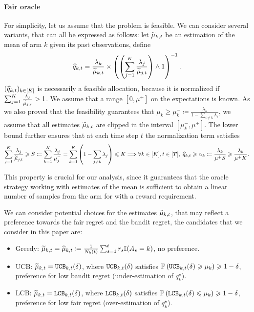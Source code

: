 \paragraph{Fair oracle} For simplicity, let us assume that the problem is feasible. We can consider several variants, that can all be expressed as follows: let $\widetilde{\mu}_{k,t}$ be an estimation of the mean of arm $k$ given its past observations, define \[ \widehat{q}_{k,t}= \frac{\lambda_k}{\widetilde{\mu}_{k, t}} \times \left(\left(\sum_{j=1}^K \frac{\lambda_j}{\widetilde{\mu}_{j, t}}\right) \wedge 1\right)^{-1}.\] 
$(\widehat{q}_{k, t})_{k \in [K]}$ is necessarily a feasible allocation, because it is normalized if $\sum_{j=1}^K \frac{\lambda_j}{\widetilde{\mu}_{j, t}}> 1$. We assume that a range $[0, \mu^+]$ on the expectations is known. As we also proved that the feasibility guarantees that $\mu_k \geq \mu_k^- \coloneqq \frac{\lambda_k}{1-\sum_{i\neq k}\lambda_i}$, we assume that all estimates $\widetilde{\mu}_{k,t}$ are clipped in the interval $[\mu_k^-, \mu^+]$. The lower bound further ensures that at each time step $t$ the normalization term satisfies \[\sum_{j=1}^K \frac{\lambda_j}{\widetilde{\mu}_{j, t}}\geqslant S \coloneqq \sum_{k=1}^K \frac{\lambda_j}{\mu_j^-}=\sum_{k=1}^K \left(1-\sum_{j\neq k} \lambda_j\right) \leqslant K \Longrightarrow \forall k\in[K], t\in[T], \; \widehat{q}_{k, t}\geqslant \alpha_k \coloneqq \frac{\lambda_k}{\mu^+ S}\geqslant \frac{\lambda_k}{\mu^+ K}.\] 

This property is crucial for our analysis, since it guarantees that the oracle strategy working with estimates of the mean is sufficient to obtain a linear number of samples from the arm for with a reward requirement. 


We can consider potential choices for the estimates $\widetilde{\mu}_{k,t}$, that may reflect a preference towards the fair regret and the bandit regret, the candidates that we consider in this paper are:
\begin{itemize}
	\item Greedy: $\widetilde{\mu}_{k, t} = \widehat{\mu}_{k, t} \coloneqq \frac{1}{N_k(t)}\sum_{s=1}^t r_s\mathbb{I}(A_s=k)$, no preference.
	\item UCB: $\widetilde{\mu}_{k, t} = \texttt{UCB}_{k, t}(\delta)$, where $\texttt{UCB}_{k, t}(\delta)$ satisfies $\mathbb{P}\left(\texttt{UCB}_{k, t}(\delta) \geqslant \mu_k\right) \geqslant 1-\delta$, preference for low bandit regret (under-estimation of $q_k^\star$).
	\item LCB: $\widetilde{\mu}_{k, t} = \texttt{LCB}_{k, t}(\delta)$, where $\texttt{LCB}_{k, t}(\delta)$ satisfies $\mathbb{P}\left(\texttt{LCB}_{k, t}(\delta) \leqslant \mu_k\right) \geqslant 1-\delta$, preference for low fair regret (over-estimation of $q_k^\star$).
\end{itemize}

